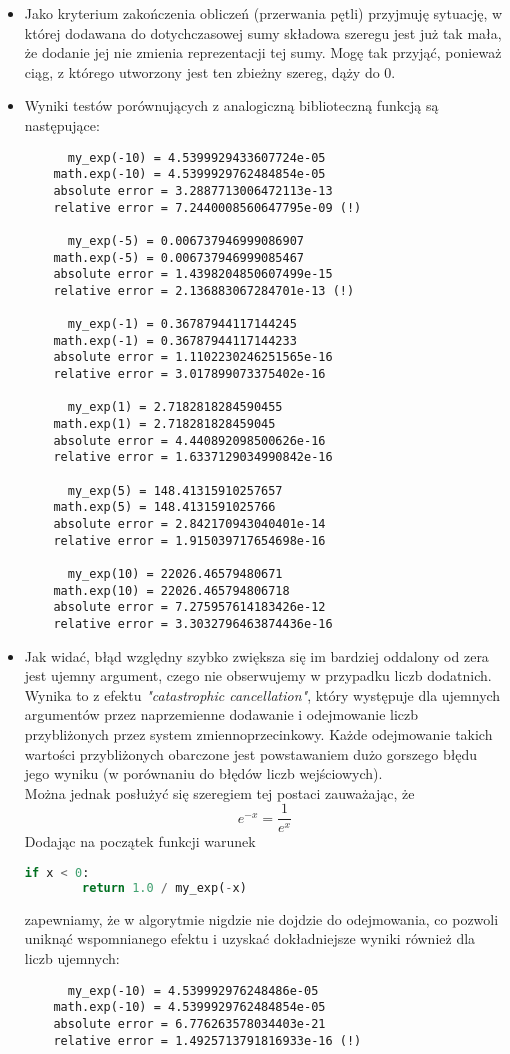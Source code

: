 \documentclass{article}
\begin{document}
\begin{itemize}
    \item Jako kryterium zakończenia obliczeń (przerwania pętli) przyjmuję sytuację, w której dodawana do dotychczasowej sumy składowa szeregu jest już tak mała, że dodanie jej nie zmienia reprezentacji tej sumy. Mogę tak przyjąć, ponieważ ciąg, z którego utworzony jest ten zbieżny szereg, dąży do 0.
    \item Wyniki testów porównujących z analogiczną biblioteczną funkcją są następujące:
    \begin{verbatim}
      my_exp(-10) = 4.5399929433607724e-05
    math.exp(-10) = 4.5399929762484854e-05
    absolute error = 3.2887713006472113e-13
    relative error = 7.2440008560647795e-09 (!)
    
      my_exp(-5) = 0.006737946999086907
    math.exp(-5) = 0.006737946999085467
    absolute error = 1.4398204850607499e-15
    relative error = 2.136883067284701e-13 (!)
    
      my_exp(-1) = 0.36787944117144245
    math.exp(-1) = 0.36787944117144233
    absolute error = 1.1102230246251565e-16
    relative error = 3.017899073375402e-16
    
      my_exp(1) = 2.7182818284590455
    math.exp(1) = 2.718281828459045
    absolute error = 4.440892098500626e-16
    relative error = 1.6337129034990842e-16
    
      my_exp(5) = 148.41315910257657
    math.exp(5) = 148.4131591025766
    absolute error = 2.842170943040401e-14
    relative error = 1.915039717654698e-16
    
      my_exp(10) = 22026.46579480671
    math.exp(10) = 22026.465794806718
    absolute error = 7.275957614183426e-12
    relative error = 3.3032796463874436e-16
    \end{verbatim}
    \item Jak widać, błąd względny szybko zwiększa się im bardziej oddalony od zera jest ujemny argument, czego nie obserwujemy w przypadku liczb dodatnich. Wynika to z efektu \textit{"catastrophic cancellation"}, który występuje dla ujemnych argumentów przez naprzemienne dodawanie i odejmowanie liczb przybliżonych przez system zmiennoprzecinkowy. Każde odejmowanie takich wartości przybliżonych obarczone jest powstawaniem dużo gorszego błędu jego wyniku (w porównaniu do błędów liczb wejściowych).\\
    Można jednak posłużyć się szeregiem tej postaci zauważając, że
    \[e^{-x} = \frac{1}{e^x}\]
    Dodając na początek funkcji warunek
    \begin{lstlisting}[language=Python]
    if x < 0:
        return 1.0 / my_exp(-x)\end{lstlisting}
    zapewniamy, że w algorytmie nigdzie nie dojdzie do odejmowania, co pozwoli uniknąć wspomnianego efektu i uzyskać dokładniejsze wyniki również dla liczb ujemnych:
    \begin{verbatim}
      my_exp(-10) = 4.539992976248486e-05
    math.exp(-10) = 4.5399929762484854e-05
    absolute error = 6.776263578034403e-21
    relative error = 1.4925713791816933e-16 (!)
    

\end{verbatim}
\end{itemize}
\end{document}
